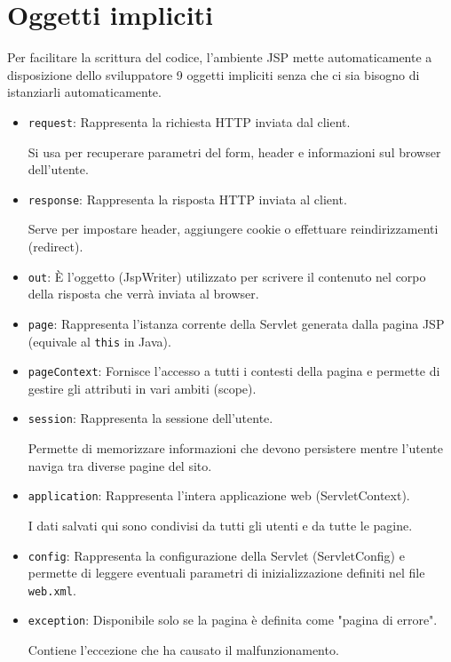 \section{Oggetti impliciti}
Per facilitare la scrittura del codice, l'ambiente JSP mette automaticamente a disposizione dello sviluppatore 9 oggetti impliciti senza che ci sia bisogno di istanziarli automaticamente.

\begin{itemize}
    \item \texttt{request}: Rappresenta la richiesta HTTP inviata dal client. 
    
    Si usa per recuperare parametri del form, header e informazioni sul browser dell'utente.
    \item \texttt{response}: Rappresenta la risposta HTTP inviata al client. 
    
    Serve per impostare header, aggiungere cookie o effettuare reindirizzamenti (redirect).
    \item \texttt{out}: È l'oggetto (JspWriter) utilizzato per scrivere il contenuto nel corpo della risposta che verrà inviata al browser.
    \item \texttt{page}: Rappresenta l'istanza corrente della Servlet generata dalla pagina JSP (equivale al \texttt{this} in Java).
    \item \texttt{pageContext}: Fornisce l'accesso a tutti i contesti della pagina e permette di gestire gli attributi in vari ambiti (scope).
    \item \texttt{session}: Rappresenta la sessione dell'utente. 
    
    Permette di memorizzare informazioni che devono persistere mentre l'utente naviga tra diverse pagine del sito.
    \item \texttt{application}: Rappresenta l'intera applicazione web (ServletContext). 
    
    I dati salvati qui sono condivisi da tutti gli utenti e da tutte le pagine.
    \item \texttt{config}: Rappresenta la configurazione della Servlet (ServletConfig) e permette di leggere eventuali parametri di inizializzazione definiti nel file \texttt{web.xml}.
    \item \texttt{exception}: Disponibile solo se la pagina è definita come "pagina di errore". 
    
    Contiene l'eccezione che ha causato il malfunzionamento.
\end{itemize}

